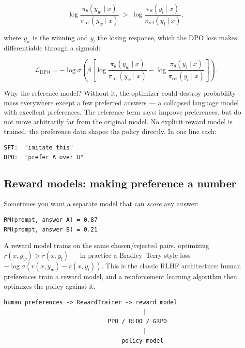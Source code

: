 \[
  \log\frac{\pi_{\theta}(y_w \mid x)}{\pi_{\text{ref}}(y_w \mid x)}
  \;>\;
  \log\frac{\pi_{\theta}(y_l \mid x)}{\pi_{\text{ref}}(y_l \mid x)},
\]

where $y_w$ is the winning and $y_l$ the losing response, which the DPO
loss makes differentiable through a sigmoid:

\[
  \mathcal{L}_{\text{DPO}}
  = -\log\sigma\!\left(
      \beta\left[
        \log\frac{\pi_{\theta}(y_w \mid x)}{\pi_{\text{ref}}(y_w \mid x)}
        -
        \log\frac{\pi_{\theta}(y_l \mid x)}{\pi_{\text{ref}}(y_l \mid x)}
      \right]
    \right).
\]

Why the reference model? Without it, the optimizer could destroy
probability mass everywhere except a few preferred answers --- a collapsed
language model with excellent preferences. The reference term says:
improve preferences, but do not move arbitrarily far from the original
model. No explicit reward model is trained; the preference data shapes the
policy directly. In one line each:

\begin{lstlisting}[language={},basicstyle=\small\ttfamily]
SFT:  "imitate this"
DPO:  "prefer A over B"
\end{lstlisting}

\subsection{Reward models: making preference a number}

Sometimes you want a separate model that can \emph{score} any answer:

\begin{lstlisting}[language={},basicstyle=\small\ttfamily]
RM(prompt, answer A) = 0.87
RM(prompt, answer B) = 0.21
\end{lstlisting}

A reward model trains on the same chosen/rejected pairs, optimizing
$r(x,y_w) > r(x,y_l)$ --- in practice a Bradley--Terry-style loss
$-\log\sigma\!\left(r(x,y_w)-r(x,y_l)\right)$. This is the classic RLHF
architecture: human preferences train a reward model, and a reinforcement
learning algorithm then optimizes the policy against it.

\begin{lstlisting}[language={},basicstyle=\small\ttfamily]
human preferences -> RewardTrainer -> reward model
                                        |
                              PPO / RLOO / GRPO
                                        |
                                  policy model
\end{lstlisting}

